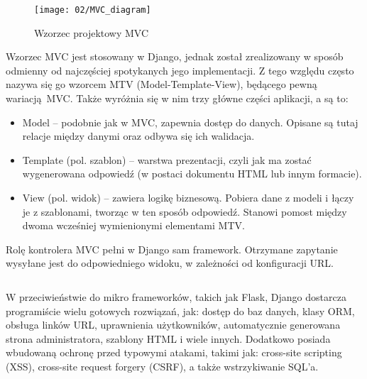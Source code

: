 \begin{figure}[h]
	\begin{center}
		\texttt{[image: 02/MVC\_diagram]}
	\end{center}
	\caption{Wzorzec projektowy MVC}
	\vspace{-0.3cm}
\end{figure}

Wzorzec MVC jest stosowany w Django, jednak został zrealizowany w sposób odmienny od najczęściej spotykanych jego implementacji. Z tego względu często nazywa się go wzorcem MTV (Model-Template-View), będącego pewną wariacją MVC. Także wyróżnia się w nim trzy główne części aplikacji, a są to:
\begin{itemize}
	\item Model -- podobnie jak w MVC, zapewnia dostęp do danych. Opisane są tutaj relacje między danymi oraz odbywa się ich walidacja.
	\item Template (pol. szablon) -- warstwa prezentacji, czyli jak ma zostać wygenerowana odpowiedź (w postaci dokumentu HTML lub innym formacie).
	\item View (pol. widok) -- zawiera logikę biznesową. Pobiera dane z modeli i łączy je z szablonami, tworząc w ten sposób odpowiedź. Stanowi pomost między dwoma wcześniej wymienionymi elementami MTV.
\end{itemize}
Rolę kontrolera MVC pełni w Django sam framework. Otrzymane zapytanie wysyłane jest do odpowiedniego widoku, w zależności od konfiguracji URL.
\begin{singlespace}
	\vspace{0.3cm}
	\inputminted[fontsize=\footnotesize]{python}{src/urls.py}
	\label{l:url}
\end{singlespace}

W przeciwieństwie do mikro frameworków, takich jak Flask, Django dostarcza programiście wielu gotowych rozwiązań, jak: dostęp do baz danych, klasy ORM, obsługa linków URL, uprawnienia użytkowników, automatycznie generowana strona administratora, szablony HTML i wiele innych. Dodatkowo posiada wbudowaną ochronę przed typowymi atakami, takimi jak: cross-site scripting (XSS), cross-site request forgery (CSRF), a także wstrzykiwanie SQL'a.

